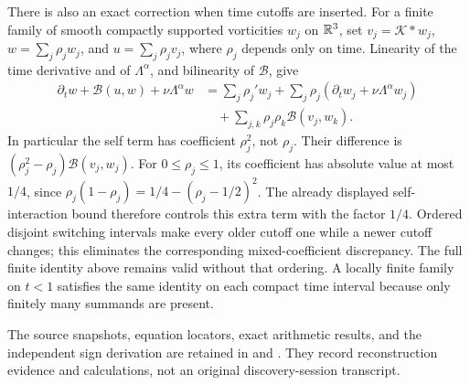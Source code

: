 There is also an exact correction when time cutoffs are inserted. For a finite
family of smooth compactly supported vorticities $w_j$ on $\mathbb R^3$, set
$v_j=\mathcal K*w_j$,
$w=\sum_j\rho_jw_j$, and $u=\sum_j\rho_jv_j$, where $\rho_j$ depends only on
time. Linearity of the time derivative and of $\Lambda^\alpha$, and bilinearity
of $\mathcal B$, give
\begin{align*}
 \partial_tw+\mathcal B(u,w)+\nu\Lambda^\alpha w
 &=\sum_j\rho_j'w_j
   +\sum_j\rho_j(\partial_tw_j+\nu\Lambda^\alpha w_j)\\
 &\quad+\sum_{j,k}\rho_j\rho_k\mathcal B(v_j,w_k).
\end{align*}
In particular the self term has coefficient $\rho_j^2$, not $\rho_j$.
Their difference is $(\rho_j^2-\rho_j)\mathcal B(v_j,w_j)$. For
$0\leq\rho_j\leq1$, its coefficient has absolute value at most $1/4$, since
$\rho_j(1-\rho_j)=1/4-(\rho_j-1/2)^2$. The already displayed self-interaction
bound therefore controls this extra term with the factor $1/4$.
Ordered disjoint switching intervals make every older cutoff one while a
newer cutoff changes; this eliminates the corresponding mixed-coefficient
discrepancy. The full finite identity above remains valid without that
ordering. A locally finite family on $t<1$ satisfies the same identity on
each compact time interval because only finitely many summands are present.

The source snapshots, equation locators, exact arithmetic results, and the
independent sign derivation are retained in
 and
. They record reconstruction
evidence and calculations, not an original discovery-session transcript.

